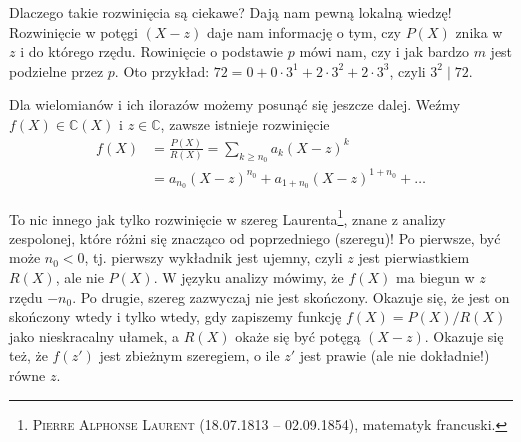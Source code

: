 \documentclass[a4paper,fleqn]{article}
\begin{document}
\begin{multicols}{2}
Dlaczego takie rozwinięcia są ciekawe? Dają nam pewną lokalną wiedzę! Rozwinięcie w potęgi $(X-z)$ daje nam informację o tym, czy $P(X)$ znika w $z$ i do którego rzędu. Rowinięcie o podstawie $p$ mówi nam, czy i jak bardzo $m$ jest podzielne przez $p$. Oto przykład: $72 = 0 + 0 \cdot 3^1 + 2\cdot 3^2+ 2\cdot 3^3$, czyli $3^2\mid 72$.

Dla wielomianów i ich ilorazów możemy posunąć się jeszcze dalej. Weźmy $f(X) \in \mathbb C(X)$ i $z\in\mathbb C$, zawsze istnieje rozwinięcie
\begin{align*}
f(X) & = \frac{P(X)}{R(X)} = \sum_{k\ge n_0} a_k(X-z)^k \\
& = a_{n_0} (X-z)^{n_0} + a_{1+n_0} (X-z)^{1+n_0} + \dots
\end{align*}

To nic innego jak tylko rozwinięcie w szereg Laurenta\footnote{\textsc{Pierre Alphonse Laurent} (18.07.1813 -- 02.09.1854), matematyk francuski.}, znane z analizy zespolonej, które różni się znacząco od poprzedniego (szeregu)! Po pierwsze, być może $n_0<0$, tj. pierwszy wykładnik jest ujemny, czyli $z$ jest pierwiastkiem $R(X)$, ale nie $P(X)$. W języku analizy mówimy, że $f(X)$ ma biegun w $z$ rzędu $-n_0$. Po drugie, szereg zazwyczaj nie jest skończony. Okazuje się, że jest on skończony wtedy i tylko wtedy, gdy zapiszemy funkcję $f(X) = P(X)/R(X)$ jako nieskracalny ułamek, a $R(X)$ okaże się być potęgą $(X-z)$. Okazuje się też, że $f(z')$ jest zbieżnym szeregiem, o ile $z'$ jest prawie (ale nie dokładnie!) równe $z$.


\end{multicols}
\end{document}
